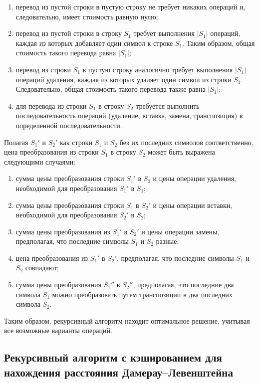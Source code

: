 \begin{enumerate}[label=\arabic*)]
	\item перевод из пустой строки в пустую строку не требует никаких операций и, следовательно, имеет стоимость равную нулю;
	\item перевод из пустой строки в строку $S_{1}$ требует выполнения $|S_{1}|$ операций, каждая из которых добавляет один символ к строке $S_{1}$. Таким образом, общая стоимость такого перевода равна $|S_{1}|$;
	\item перевод из строки $S_{1}$ в пустую строку аналогично требует выполнения $|S_{1}|$ операций удаления, каждая из которых удаляет один символ из строки $S_{1}$. Следовательно, общая стоимость такого перевода также равна $|S_{1}|$;
	\item для перевода из строки $S_{1}$ в строку $S_{2}$ требуется выполнить последовательность операций (удаление, вставка, замена, транспозиция) в определенной последовательности.
\end{enumerate}

Полагая $S_{1}'$ и $S_{2}'$ как строки $S_{1}$ и $S_{2}$ без их последних символов соответственно, цена преобразования из строки $S_{1}$ в строку $S_{2}$ может быть выражена следующими случаями:
\begin{enumerate}
   \item сумма цены преобразования строки $S_{1}'$ в $S_{2}$ и цены операции удаления, необходимой для преобразования $S_{1}'$ в $S_{1}$;
   \item сумма цены преобразования строки $S_{1}$ в $S_{2}'$ и цены операции вставки, необходимой для преобразования $S_{2}'$ в $S_{2}$;
   \item сумма цены преобразования из $S_{1}'$ в $S_{2}'$ и цены операции замены, предполагая, что последние символы $S_{1}$ и $S_{2}$ разные;
   \item цена преобразования из $S_{1}'$ в $S_{2}'$, предполагая, что последние символы $S_{1}$ и $S_{2}$ совпадают;
   \item сумма цены преобразования $S_{1}''$ в $S_{2}''$, предполагая, что последние два символа $S_{1}$ можно преобразовать путем транспозиции в два последних символа $S_{2}$.
\end{enumerate}

Таким образом, рекурсивный алгоритм находит оптимальное решение, учитывая все возможные варианты операций.

\subsection{Рекурсивный алгоритм с кэшированием для нахождения расстояния Дамерау--Левенштейна}


